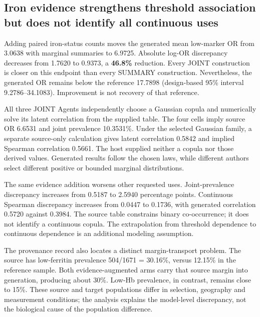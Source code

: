 \documentclass[11pt,letterpaper]{article}
\begin{document}
\FloatBarrier


\subsection{Iron evidence strengthens threshold association but does not identify all continuous uses}

Adding paired iron-status counts moves the generated mean low-marker OR from 3.0638 with marginal summaries to 6.9725. Absolute log-OR discrepancy decreases from 1.7620 to 0.9373, a \textbf{46.8\%} reduction. Every JOINT construction is closer on this endpoint than every SUMMARY construction. Nevertheless, the generated OR remains below the reference 17.7898 (design-based 95\% interval 9.2786–\allowbreak{}34.1083). Improvement is not recovery of that reference.


All three JOINT Agents independently choose a Gaussian copula and numerically solve its latent correlation from the supplied table. The four cells imply source OR 6.6531 and joint prevalence 10.3531\%. Under the selected Gaussian family, a separate source-only calculation gives latent correlation 0.5842 and implied Spearman correlation 0.5661. The host supplied neither a copula nor those derived values. Generated results follow the chosen laws, while different authors select different positive or bounded marginal distributions.


The same evidence addition worsens other requested uses. Joint-prevalence discrepancy increases from 0.5187 to 2.5940 percentage points. Continuous Spearman discrepancy increases from 0.0447 to 0.1736, with generated correlation 0.5720 against 0.3984. The source table constrains binary co-occurrence; it does not identify a continuous copula. The extrapolation from threshold dependence to continuous dependence is an additional modeling assumption.


The provenance record also locates a distinct margin-transport problem. The source has low-ferritin prevalence 504/\allowbreak{}1671 = 30.16\%, versus 12.15\% in the reference sample. Both evidence-augmented arms carry that source margin into generation, producing about 30\%. Low-Hb prevalence, in contrast, remains close to 15\%. These source and target populations differ in selection, geography and measurement conditions; the analysis explains the model-level discrepancy, not the biological cause of the population difference.
\end{document}
